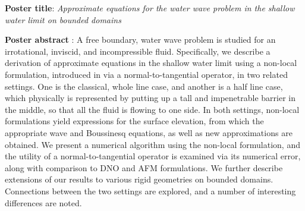\documentclass[10pt,reqno,oneside,a4paper]{article}
\author{Sultan Aitzhan}
\date{\today}
\begin{document}
\thispagestyle{fancy}

\textbf{Poster title}: \textit{Approximate equations for the water wave problem in the shallow water limit on bounded domains}

\textbf{Poster abstract} : A free boundary, water wave problem is studied for an irrotational, inviscid, and incompressible fluid. Specifically, we describe a derivation of approximate equations in the shallow water limit using a non-local formulation, introduced in \cite{KV2013} via a normal-to-tangential operator, in two related settings. One is the classical, whole line case, and another is a half line case, which physically is represented by putting up a tall and impenetrable barrier in the middle, so that all the fluid is flowing to one side. In both settings, non-local formulations yield expressions for the surface elevation, from which the appropriate wave and Boussinesq equations, as well as new approximations are obtained. We present a numerical algorithm using the non-local formulation, and the utility of a normal-to-tangential operator is examined via its numerical error, along with comparison to DNO \cite{DNO} and AFM \cite{AFM} formulations. We further describe extensions of our results to various rigid geometries on bounded domains. Connections between the two settings are explored, and a number of interesting differences are noted.


{\small}
\end{document}
